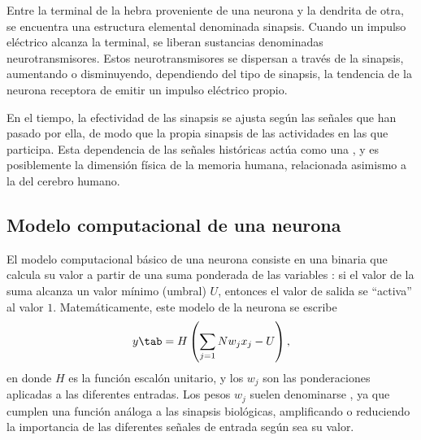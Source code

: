 Entre la terminal de la hebra proveniente de una neurona y la
dendrita de otra, se encuentra una estructura elemental denominada
sinapsis.  Cuando un impulso eléctrico alcanza la terminal, 
se liberan sustancias denominadas neurotransmisores. Estos
neurotransmisores se dispersan a través de la sinapsis, aumentando o
disminuyendo, dependiendo del tipo de sinapsis, la tendencia de la
neurona receptora de emitir un impulso eléctrico propio.

En el tiempo, la efectividad de las sinapsis se ajusta según las
señales que han pasado por ella, de modo que la propia sinapsis
 de las actividades en las que participa. Esta dependencia
de las señales históricas actúa como una , y es
posiblemente la dimensión física de la memoria humana, relacionada
asimismo a la  del cerebro humano.
%
%
\subsection{Modelo computacional de una neurona}
%
El modelo computacional básico de una neurona 
\cite{mcculloch-pitts} consiste en una
 binaria que calcula su valor 
a partir de una suma ponderada de las variables :
si el valor de la suma
alcanza un valor mínimo (umbral) $U$, entonces el valor de salida se
``activa'' al valor $1$.  Matemáticamente, este modelo de la neurona
se escribe
%
\begin{align}\label{e2:neuron-basic}
  y \tab = H\left( \sum_{j=1}{N} w_j x_j - U\right),
\end{align}
%
en donde $H$ es la función escalón unitario, y los  $w_j$ son
las ponderaciones aplicadas a las diferentes entradas.  Los pesos
$w_j$ suelen denominarse , ya que cumplen una
función análoga a las sinapsis biológicas, amplificando o reduciendo
la importancia de las diferentes señales de entrada según sea su
valor.


